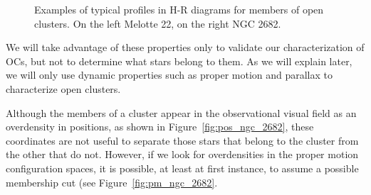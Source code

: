 \documentclass[11pt, a4paper, english]{book}
\begin{document}
\begin{figure}[htbp]
\begin{subfigure}{0.9\textwidth}
\begin{subfigure}[t]{0.45\textwidth}
    \end{subfigure}
  \end{subfigure}
  \caption{Examples of typical profiles in H-R diagrams for members of open clusters. On the left Melotte 22, on the right NGC 2682.}
  \label{fig:examples_of_hr_diagrams}
\end{figure}

We will take advantage of these properties only to validate our characterization of OCs,
but not to determine what stars belong to them. As we will explain later,
we will only use dynamic properties such as proper motion and parallax to characterize open clusters.

Although the members of a cluster appear in the observational visual field as an overdensity in positions,
as shown in Figure~\ref{fig:pos_ngc_2682},
these coordinates are not useful to separate those stars that belong to the cluster from the other that do not.
However, if we look for overdensities in the proper motion configuration spaces, it is possible, at least at first instance,
to assume a possible membership cut (see Figure~\ref{fig:pm_ngc_2682}.
\end{document}
